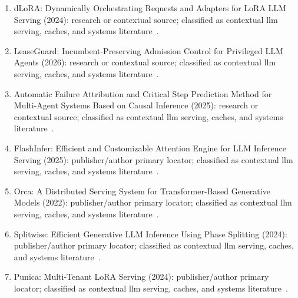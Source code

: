 \begin{enumerate}
\item {dLoRA}: Dynamically Orchestrating Requests and Adapters for {LoRA} {LLM} Serving (2024): research or contextual source; classified as contextual llm serving, caches, and systems literature~\cite{ext052}.
\item LeaseGuard: Incumbent-Preserving Admission Control for Privileged LLM Agents (2026): research or contextual source; classified as contextual llm serving, caches, and systems literature~\cite{ext064}.
\item Automatic Failure Attribution and Critical Step Prediction Method for Multi-Agent Systems Based on Causal Inference (2025): research or contextual source; classified as contextual llm serving, caches, and systems literature~\cite{ext114}.
\item FlashInfer: Efficient and Customizable Attention Engine for LLM Inference Serving (2025): publisher/author primary locator; classified as contextual llm serving, caches, and systems literature~\cite{ext149}.
\item Orca: A Distributed Serving System for Transformer-Based Generative Models (2022): publisher/author primary locator; classified as contextual llm serving, caches, and systems literature~\cite{ext150}.
\item Splitwise: Efficient Generative LLM Inference Using Phase Splitting (2024): publisher/author primary locator; classified as contextual llm serving, caches, and systems literature~\cite{ext151}.
\item Punica: Multi-Tenant LoRA Serving (2024): publisher/author primary locator; classified as contextual llm serving, caches, and systems literature~\cite{ext152}.
\end{enumerate}
\normalsize


